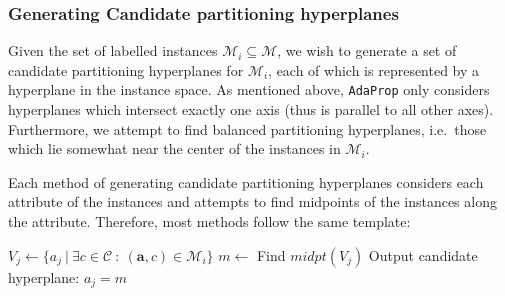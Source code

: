 \documentclass[a4paper,12pt]{article} %
\newcommand{\AdaProp}{\texttt{AdaProp}\xspace}
\newcommand{\mcl}[1]{\mathcal{#1}}
\newcommand{\vect}[1]{\boldsymbol{#1}}
\begin{document}
\subsubsection{Generating Candidate partitioning hyperplanes}
\label{secCandGen}

Given the set of labelled instances $\mcl{M}_i \subseteq \mcl{M}$,
    we wish to generate a set of candidate partitioning hyperplanes for $\mcl{M}_i$,
    each of which is represented by a hyperplane in the instance space.
As mentioned above, 
    \AdaProp only considers hyperplanes 
    which intersect exactly one axis
    (thus is parallel to all other axes).
Furthermore, we attempt to find balanced partitioning hyperplanes, 
    i.e.\ those which lie somewhat near the center of the instances
    in $\mcl{M}_i$.

Each method of generating candidate partitioning hyperplanes 
    considers each attribute of the instances and attempts 
    to find midpoints of the instances along the attribute.
Therefore, most methods follow the same template:
    \begin{algorithmic}
        \State $V_j \gets \{ a_j ~\big|~ \exists c \in \mcl{C} ~:~ (\vect{a},c) \in \mcl{M}_i \}$
        \State $m \gets $ Find $midpt(V_j)$
        \State Output candidate hyperplane: $a_j = m $
    \EndFor
    \end{algorithmic}
        
\end{document}
